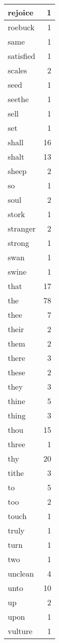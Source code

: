 \begin{center}
\begin{longtable}{l|r}
rejoice & 1 \\ \hline
roebuck & 1 \\ \hline
same & 1 \\ \hline
satisfied & 1 \\ \hline
scales & 2 \\ \hline
seed & 1 \\ \hline
seethe & 1 \\ \hline
sell & 1 \\ \hline
set & 1 \\ \hline
shall & 16 \\ \hline
shalt & 13 \\ \hline
sheep & 2 \\ \hline
so & 1 \\ \hline
soul & 2 \\ \hline
stork & 1 \\ \hline
stranger & 2 \\ \hline
strong & 1 \\ \hline
swan & 1 \\ \hline
swine & 1 \\ \hline
that & 17 \\ \hline
the & 78 \\ \hline
thee & 7 \\ \hline
their & 2 \\ \hline
them & 2 \\ \hline
there & 3 \\ \hline
these & 2 \\ \hline
they & 3 \\ \hline
thine & 5 \\ \hline
thing & 3 \\ \hline
thou & 15 \\ \hline
three & 1 \\ \hline
thy & 20 \\ \hline
tithe & 3 \\ \hline
to & 5 \\ \hline
too & 2 \\ \hline
touch & 1 \\ \hline
truly & 1 \\ \hline
turn & 1 \\ \hline
two & 1 \\ \hline
unclean & 4 \\ \hline
unto & 10 \\ \hline
up & 2 \\ \hline
upon & 1 \\ \hline
vulture & 1 \\ \hline

\end{longtable}
\end{center}
